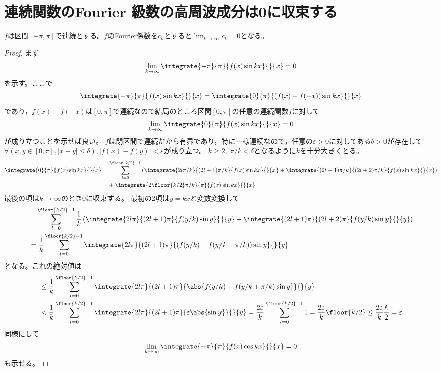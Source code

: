     \section{連続関数のFourier 級数の高周波成分は0に収束する}
        \label{連続関数のFourier 級数の高周波成分は0に収束する}
        \begin{shadebox}
            $f$は区間$[-\pi,\pi]$で連続とする。$f$のFourier係数を$c_k$とすると$\lim_{k\to\infty}c_k = 0$となる。
        \end{shadebox}
        \begin{proof}
            \quad\par
            まず
            \[ \lim_{k\to\infty}\integrate{-\pi}{\pi}{f(x)\sin kx}{}{x} = 0 \]
            を示す。ここで
            \[ \integrate{-\pi}{\pi}{f(x)\sin kx}{}{x} = \integrate{0}{\pi}{(f(x)-f(-x))\sin kx}{}{x} \]
            であり，$f(x)-f(-x)$は$[0,\pi]$で連続なので結局のところ区間$[0,\pi]$の任意の連続関数$f$に対して
            \[ \lim_{k\to\infty}\integrate{0}{\pi}{f(x)\sin kx}{}{x} = 0 \]
            が成り立つことを示せば良い。
            $f$は閉区間で連続だから有界であり，特に一様連続なので，任意の$\varepsilon>0$に対してある$\delta>0$が存在して
            $\forall (x,y\in[0,\pi],|x-y|\leq\delta),|f(x)-f(y)|<\varepsilon$が成り立つ。
            $k \geq 2,\;\pi/k < \delta$となるように$k$を十分大きくとる。
            \begin{align*}
                \integrate{0}{\pi}{f(x)\sin kx}{}{x} &= \sum_{l=0}^{\floor{k/2}-1}\left(\integrate{2l\pi/k}{(2l+1)\pi/k}{f(x) \sin kx}{}{x} + \integrate{(2l+1)\pi/k}{(2l+2)\pi/k}{f(x) \sin kx}{}{x}\right) \\
                &\quad + \integrate{2\floor{k/2}\pi/k}{\pi}{f(x)\sin kx}{}{x}
            \end{align*}
            最後の項は$k\to\infty$のとき$0$に収束する。
            最初の2項は$y=kx$と変数変換して
            \begin{align*}
                &\quad \sum_{l=0}^{\floor{k/2}-1}\frac{1}{k}\left(\integrate{2l\pi}{(2l+1)\pi}{f(y/k) \sin y}{}{y} + \integrate{(2l+1)\pi}{(2l+2)\pi}{f(y/k) \sin y}{}{y}\right) \\
                &= \frac{1}{k} \sum_{l=0}^{\floor{k/2}-1} \integrate{2l\pi}{(2l+1)\pi}{(f(y/k) - f(y/k+\pi/k)) \sin y}{}{y}
            \end{align*}
            となる。これの絶対値は
            \begin{align*}
                &\leq \frac{1}{k} \sum_{l=0}^{\floor{k/2}-1} \integrate{2l\pi}{(2l+1)\pi}{\abs{f(y/k) - f(y/k+\pi/k) \sin y}}{}{y} \\
                &< \frac{1}{k} \sum_{l=0}^{\floor{k/2}-1} \integrate{2l\pi}{(2l+1)\pi}{\varepsilon\abs{\sin y}}{}{y} = \frac{2\varepsilon}{k} \sum_{l=0}^{\floor{k/2}-1}1 = \frac{2\varepsilon}{k}\floor{k/2} \leq \frac{2\varepsilon}{k}\frac{k}{2} = \varepsilon
            \end{align*}
            同様にして
            \[ \lim_{k\to\infty}\integrate{-\pi}{\pi}{f(x)\cos kx}{}{x} = 0 \]
            も示せる。
        \end{proof}
